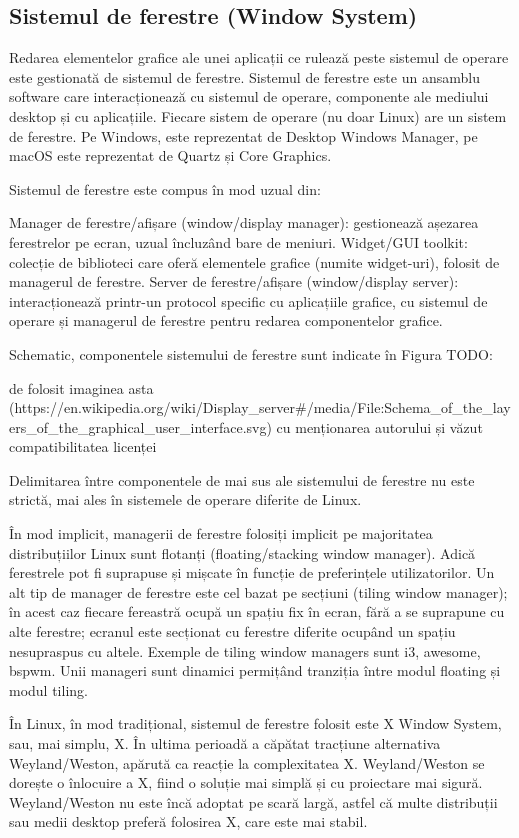 \subsection{Sistemul de ferestre (Window System)}
\label{sec:ui:window-system}

Redarea elementelor grafice ale unei aplicații ce rulează peste sistemul de operare este gestionată de sistemul de ferestre. Sistemul de ferestre este un ansamblu software care interacționează cu sistemul de operare, componente ale mediului desktop și cu aplicațiile. Fiecare sistem de operare (nu doar Linux) are un sistem de ferestre. Pe Windows, este reprezentat de Desktop Windows Manager, pe macOS este reprezentat de Quartz și Core Graphics.

Sistemul de ferestre este compus în mod uzual din:

Manager de ferestre/afișare (window/display manager): gestionează așezarea ferestrelor pe ecran, uzual încluzând bare de meniuri.
Widget/GUI toolkit: colecție de biblioteci care oferă elementele grafice (numite widget-uri), folosit de managerul de ferestre.
Server de ferestre/afișare (window/display server): interacționează printr-un protocol specific cu aplicațiile grafice, cu sistemul de operare și managerul de ferestre pentru redarea componentelor grafice.

Schematic, componentele sistemului de ferestre sunt indicate în Figura TODO:

de folosit imaginea asta (https://en.wikipedia.org/wiki/Display_server#/media/File:Schema_of_the_layers_of_the_graphical_user_interface.svg) cu menționarea autorului și văzut compatibilitatea licenței

Delimitarea între componentele de mai sus ale sistemului de ferestre nu este strictă, mai ales în sistemele de operare diferite de Linux.

În mod implicit, managerii de ferestre folosiți implicit pe majoritatea distribuțiilor Linux sunt flotanți (floating/stacking window manager). Adică ferestrele pot fi suprapuse și mișcate în funcție de preferințele utilizatorilor. Un alt tip de manager de ferestre este cel bazat pe secțiuni (tiling window manager); în acest caz fiecare fereastră ocupă un spațiu fix în ecran, fără a se suprapune cu alte ferestre; ecranul este secționat cu ferestre diferite ocupând un spațiu nesupraspus cu altele. Exemple de tiling window managers sunt i3, awesome, bspwm. Unii manageri sunt dinamici permițând tranziția între modul floating și modul tiling.

În Linux, în mod tradițional, sistemul de ferestre folosit este X Window System, sau, mai simplu, X. În ultima perioadă a căpătat tracțiune alternativa Weyland/Weston, apărută ca reacție la complexitatea X. Weyland/Weston se dorește o înlocuire a X, fiind o soluție mai simplă și cu proiectare mai sigură. Weyland/Weston nu este încă adoptat pe scară largă, astfel că multe distribuții sau medii desktop preferă folosirea X, care este mai stabil.

